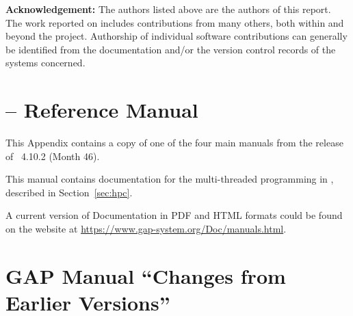\documentclass{deliverablereport}
\author{Alexander Konovalov, Stephen Linton and Michael Torpey}
\begin{document}
\maketitle
\githubissuedescription

\vfill

\textbf{Acknowledgement:} The authors listed above are the authors of
this report. The work reported on includes contributions from many
others, both within and beyond the \ODK project. Authorship of
individual software contributions can generally be identified from
the documentation and/or the version control records of the systems concerned.

\vfill
\newpage
\tableofcontents















\clearpage
\appendix

\section{\HPCGAP -- Reference Manual}\label{sec:hpc-manual}

This Appendix contains a copy of 
one of the four main \GAP manuals
from the release of \GAP~4.10.2 (Month 46).

This manual contains documentation for the multi-threaded programming
in \GAP, described in Section~\ref{sec:hpc}.

A current version of \GAP Documentation in PDF and HTML formats
could be found on the \GAP website at \url{https://www.gap-system.org/Doc/manuals.html}.

%

\section{GAP Manual ``Changes from Earlier Versions''}\label{sec:changes-manual}
\end{document}
